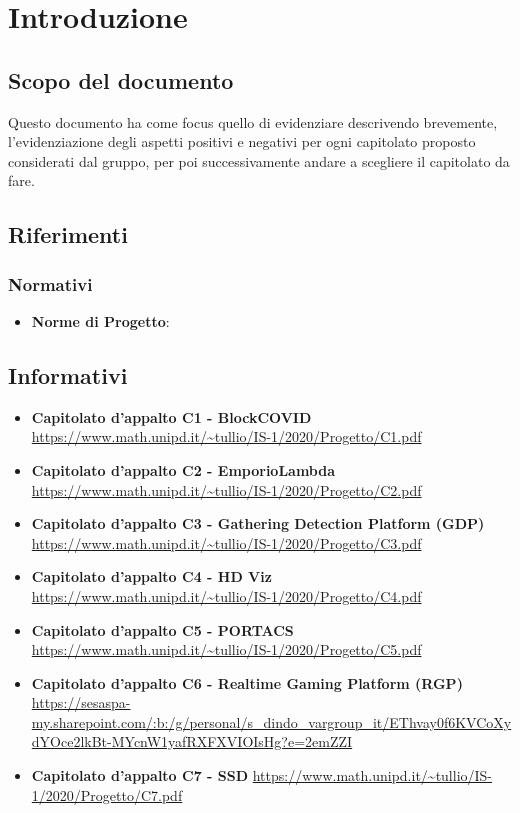 \section{Introduzione}

	\subsection{Scopo del documento}
	Questo documento ha come focus quello di evidenziare descrivendo brevemente, l'evidenziazione degli aspetti positivi e negativi per ogni capitolato proposto considerati dal gruppo, per poi successivamente andare a scegliere il capitolato da fare.

	\subsection{Riferimenti}
		\subsubsection{Normativi}
		\begin{itemize}
			\item\textbf{Norme di Progetto}: 
		\end{itemize}
		
		\subsection{Informativi}
		\begin{itemize}
			\item\textbf{Capitolato d'appalto C1 - BlockCOVID}
			\url{https://www.math.unipd.it/~tullio/IS-1/2020/Progetto/C1.pdf}
			
			\item\textbf{Capitolato d'appalto C2 - EmporioLambda}
			\url{https://www.math.unipd.it/~tullio/IS-1/2020/Progetto/C2.pdf}
			
			\item\textbf{Capitolato d'appalto C3 - Gathering Detection Platform (GDP)}
			\url{https://www.math.unipd.it/~tullio/IS-1/2020/Progetto/C3.pdf}
			
			\item\textbf{Capitolato d'appalto C4 - HD Viz}
			\url{https://www.math.unipd.it/~tullio/IS-1/2020/Progetto/C4.pdf}
			
			\item\textbf{Capitolato d'appalto C5 - PORTACS}
			\url{https://www.math.unipd.it/~tullio/IS-1/2020/Progetto/C5.pdf}
			
			\item\textbf{Capitolato d'appalto C6 - Realtime Gaming Platform (RGP)}
			\url{https://sesaspa-my.sharepoint.com/:b:/g/personal/s_dindo_vargroup_it/EThvay0f6KVCoXydYOce2lkBt-MYcnW1yafRXFXVIOIsHg?e=2emZZI}
			
			\item\textbf{Capitolato d'appalto C7 - SSD}
			\url{https://www.math.unipd.it/~tullio/IS-1/2020/Progetto/C7.pdf}
		\end{itemize}
